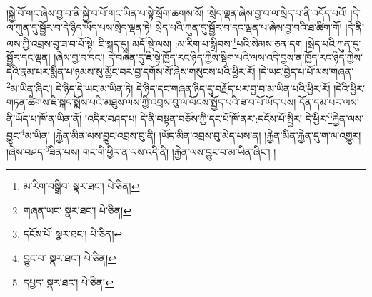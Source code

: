 །སྐྱེ་བོ་གང་ཞེས་བྱ་བ་ནི་སྐྱེ་བ་པོ་གང་ཡིན་པ་སྟེ་སྲོག་ཆགས་སོ། །སྲེད་ལྡན་ཞེས་བྱ་བ་ལ་སྲེད་པ་ནི་འདོད་པའོ། །དེ་ལ་ཀུན་དུ་སྦྱོར་བ་དེ་ཉིད་ཡོད་པས་སྲེད་ལྡན་ཏེ། སྲེད་པའི་ཀུན་དུ་སྦྱོར་བ་དང་ལྡན་པ་ཞེས་བྱ་བའི་ཐ་ཚིག་གོ། །དེ་ནི་ལས་ཀྱི་འབྲས་བུ་ཟ་བ་པོ་སྟེ། ཇི་སྐད་དུ། མདོ་སྡེ་ལས། :མ་རིག་པ་སྒྲིབས་\footnote{མ་རིག་བསྒྲིབ་  སྣར་ཐང་།  པེ་ཅིན། }པའི་སེམས་ཅན་དག །སྲེད་པའི་ཀུན་དུ་སྦྱོར་དང་ལྡན། །ཞེས་བྱ་བ་དང་། དེ་བཞིན་དུ་ཇི་སྟེ་ཁྱོད་རང་ཉིད་ཀྱིས་སྡིག་པའི་ལས་འདི་བྱས་ན་ཁྱོད་རང་ཉིད་ཀྱིས་དེའི་རྣམ་པར་སྨིན་པ་ཉམས་སུ་མྱོང་བར་བྱ་དགོས་སོ་ཞེས་གསུངས་པའི་ཕྱིར་རོ། །དེ་ཡང་བྱེད་པ་པོ་ལས་གཞན་\footnote{གཞན་ཡང་  སྣར་ཐང་།  པེ་ཅིན། }མ་ཡིན་ཞིང་། དེ་ཉིད་དེ་ཡང་མ་ཡིན་ཏེ། དེ་ཉིད་དང་གཞན་ཉིད་དུ་བརྗོད་པར་བྱ་བ་མ་ཡིན་པའི་ཕྱིར་རོ། །དེའི་ཕྱིར་གཏན་ཚིགས་ཇི་སྐད་སྨོས་པའི་མཐུས་ལས་ཀྱི་འབྲས་བུ་ལ་ལོངས་སྤྱོད་པའི་ཟ་བ་པོ་ཡོད་པས། དོན་དམ་པར་ལས་ནི་ཡོད་པ་ཁོ་ན་ཡིན་ནོ། །འདིར་བཤད་པ། དེ་ནི་བསྟན་བཅོས་ཀྱི་དང་པོ་ཁོ་ནར་:དངོས་པོ་སྤྱིར། དེ་ཕྱིར་\footnote{དངོས་པོ་  སྣར་ཐང་།  པེ་ཅིན། }རྐྱེན་ལས་བྱུང་\footnote{བྱུང་བ་  སྣར་ཐང་།  པེ་ཅིན། }མ་ཡིན། །རྐྱེན་མིན་ལས་བྱུང་འབྲས་བུ་ནི། །ཡོད་མིན་འབྲས་བུ་མེད་པས་ན། །རྐྱེན་མིན་རྐྱེན་དུ་ག་ལ་འགྱུར། །ཞེས་བཤད་\footnote{དཔྱད་  སྣར་ཐང་།  པེ་ཅིན། }ཟིན་པས། གང་གི་ཕྱིར་ན་ལས་འདི་ནི། །རྐྱེན་ལས་བྱུང་བ་མ་ཡིན་ཞིང་། །
